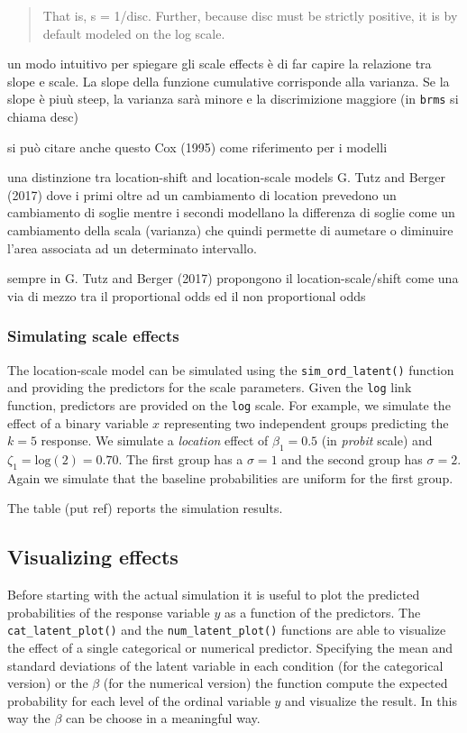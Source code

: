 \documentclass[
  man,floatsintext]{apa6}
\begin{document}
\begin{quote}
That is, s = 1/disc. Further, because disc must be strictly positive, it is by default modeled on the log scale.
\end{quote}

un modo intuitivo per spiegare gli scale effects è di far capire la relazione tra slope e scale. La slope della funzione cumulative corrisponde alla varianza. Se la slope è piuù steep, la varianza sarà minore e la discrimizione maggiore (in \texttt{brms} si chiama desc)

si può citare anche questo Cox (1995) come riferimento per i modelli

una distinzione tra location-shift and location-scale models G. Tutz and Berger (2017) dove i primi oltre ad un cambiamento di location prevedono un cambiamento di soglie mentre i secondi modellano la differenza di soglie come un cambiamento della scala (varianza) che quindi permette di aumetare o diminuire l'area associata ad un determinato intervallo.

sempre in G. Tutz and Berger (2017) propongono il location-scale/shift come una via di mezzo tra il proportional odds ed il non proportional odds

\subsubsection{Simulating scale effects}\label{simulating-scale-effects}

The location-scale model can be simulated using the \texttt{sim\_ord\_latent()} function and providing the predictors for the scale parameters. Given the \texttt{log} link function, predictors are provided on the \texttt{log} scale. For example, we simulate the effect of a binary variable \(x\) representing two independent groups predicting the \(k = 5\) response. We simulate a \emph{location} effect of \(\beta_1 = 0.5\) (in \emph{probit} scale) and \(\zeta_1 = \text{log}(2) = 0.70\). The first group has a \(\sigma = 1\) and the second group has \(\sigma = 2\). Again we simulate that the baseline probabilities are uniform for the first group.

The table (put ref) reports the simulation results.

\subsection{Visualizing effects}\label{visualizing-effects}

Before starting with the actual simulation it is useful to plot the predicted probabilities of the response variable \(y\) as a function of the predictors. The \texttt{cat\_latent\_plot()} and the \texttt{num\_latent\_plot()} functions are able to visualize the effect of a single categorical or numerical predictor. Specifying the mean and standard deviations of the latent variable in each condition (for the categorical version) or the \(\beta\) (for the numerical version) the function compute the expected probability for each level of the ordinal variable \(y\) and visualize the result. In this way the \(\beta\) can be choose in a meaningful way.
\end{document}
